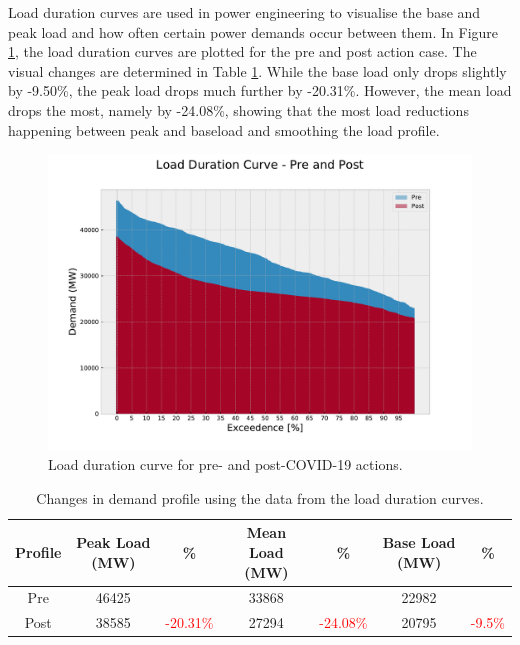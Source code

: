 \documentclass[energies,article,submit,moreauthors,pdftex]{Definitions/mdpi}
\begin{document}
Load duration curves are used in power engineering to visualise the base and peak load and how often certain power demands occur between them. In Figure \ref{fig:load_duration}, the load duration curves are plotted for the pre and post action case. The visual changes are determined in Table \ref{table:load-duration}. While the base load only drops slightly by -9.50\%, the peak load drops much further by -20.31\%. However, the mean load drops the most, namely by -24.08\%, showing that the most load reductions happening between peak and baseload and smoothing the load profile.  %

\begin{figure}[b]
\centering
\hspace{-25pt}\includegraphics[width=9 cm]{Graphics/Load_duration_curve.pdf}
\caption{Load duration curve for pre- and post-COVID-19 actions.}\label{fig:load_duration}
\end{figure}  

\begin{table}[H]
\caption{Changes in demand profile using the data from the load duration curves. }
\centering
\begin{tabular}{ccccccc}
\toprule
\textbf{Profile} & \textbf{Peak Load (MW)}	& \textbf{\%} & \textbf{ Mean Load (MW)}	& \textbf{\%}	& \textbf{ Base Load (MW)}	& \textbf{\%}\\
\midrule
Pre	& 46425 & & 33868 & & 22982 &  \\
Post & 38585 & \textcolor{red}{-20.31\%} & 27294 & \textcolor{red}{-24.08\%} & 20795 & \textcolor{red}{-9.5\%} \\

\bottomrule
\end{tabular}
\label{table:load-duration}
\end{table}
\end{document}
